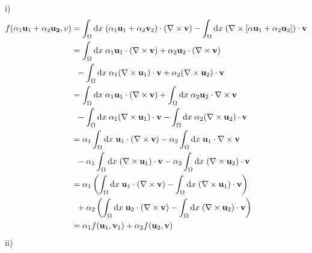 \documentclass[letterpaper,12pt,oneside,final]{book}
\begin{document}
i) 
\begin{equation*}
\begin{split}
	f(\alpha_{1}\vb{u}_{1}+\alpha_{2}\vb{u_{2}}, v) & = \int_{\Omega}\text{d}x\; (\alpha_{1}\vb{u}_{1}+\alpha_{2}\vb{v}_{2}) \cdot (\nabla \times \vb{v}) - \int_{\Omega }\text{d}x\;(\nabla \times \left[\alpha\vb{u}_{1}+\alpha_{2}\vb{u}_{2}\right])\cdot \vb{v}\\ 
& = \int_{\Omega}\text{d}x\;\alpha_{1}\vb{u}_{1}\cdot (\nabla \times \vb{v} ) + \alpha_{2}\vb{u}_{2} \cdot (\nabla \times \vb{v} ) \\
& \;\;- \int_{\Omega }\text{d}x\;\alpha_{1}(\nabla \times \vb{u}_{1} ) \cdot \vb{v} + \alpha_{2}(\nabla \times \vb{u}_{2} )\cdot \vb{v}  \\ 
& = \int_{\Omega }\text{d}x\;\alpha_{1}\vb{u}_{1}\cdot (\nabla \times \vb{v}) + \int_{\Omega }\text{d}x\;\alpha_{2}\vb{u}_{2}\cdot \nabla \times \vb{v} \\ 
& \;\;- \int_{\Omega }\text{d}x\;\alpha_{1}(\nabla \times \vb{u}_{1} ) \cdot \vb{v} - \int_{\Omega }\text{d}x\;\alpha_{2}(\nabla \times \vb{u}_{2} )\cdot \vb{v}\\ 
& = \alpha_{1}\int_{\Omega }\text{d}x\;\vb{u}_{1}\cdot (\nabla \times \vb{v}) - \alpha_{2}\int_{\Omega }\text{d}x\;\vb{u}_{1}\cdot \nabla \times \vb{v} \\
& \;\;- \alpha_{1}\int_{\Omega }\text{d}x\;(\nabla \times \vb{u}_{1} ) \cdot \vb{v} - \alpha_{2}\int_{\Omega }\text{d}x\;(\nabla \times \vb{u}_{2} )\cdot \vb{v}\\
& = \alpha_{1}\left( \int_{\Omega }\text{d}x\;\vb{u}_{1}\cdot (\nabla \times \vb{v}) - \int_{\Omega }\text{d}x\;(\nabla \times \vb{u}_{1} ) \cdot \vb{v} \right) \\ 
& \;\;+ \alpha_{2}\left( \int_{\Omega }\text{d}x\;\vb{u}_{2}\cdot (\nabla \times \vb{v}) - \int_{\Omega }\text{d}x\;(\nabla \times \vb{u}_{2} ) \cdot \vb{v} \right) \\ 
& = \alpha_{1}f(\vb{u}_{1},\vb{v}_{1}) + \alpha_{2}f(\vb{u}_{2},\vb{v})
\end{split}
\end{equation*}
ii)
\end{document}
